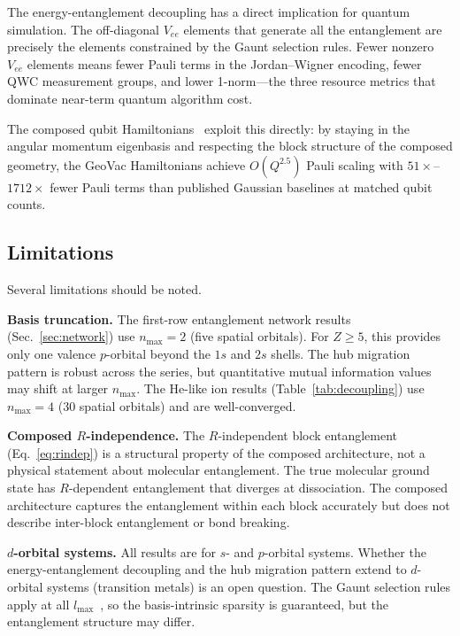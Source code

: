 \documentclass[twocolumn,pra,amsmath,amssymb,superscriptaddress]{revtex4-2}
\begin{document}
The energy-entanglement decoupling has a direct implication for
quantum simulation.  The off-diagonal $V_{ee}$ elements that
generate all the entanglement are precisely the elements constrained
by the Gaunt selection rules.  Fewer nonzero $V_{ee}$ elements
means fewer Pauli terms in the Jordan--Wigner encoding, fewer QWC
measurement groups, and lower 1-norm---the three resource metrics
that dominate near-term quantum algorithm cost.

The composed qubit Hamiltonians~\cite{GeoVac_Paper14} exploit this
directly: by staying in the angular momentum eigenbasis and
respecting the block structure of the composed geometry, the
GeoVac Hamiltonians achieve $O(Q^{2.5})$ Pauli scaling with
$51\times$--$1712\times$ fewer Pauli terms than published Gaussian
baselines at matched qubit counts.

\subsection{Limitations}

Several limitations should be noted.

\medskip\noindent\textbf{Basis truncation.}  The first-row
entanglement network results (Sec.~\ref{sec:network}) use
$n_{\max} = 2$ (five spatial orbitals).  For $Z \geq 5$, this
provides only one valence $p$-orbital beyond the $1s$ and $2s$
shells.  The hub migration pattern is robust across the series,
but quantitative mutual information values may shift at larger
$n_{\max}$.  The He-like ion results (Table~\ref{tab:decoupling})
use $n_{\max} = 4$ (30 spatial orbitals) and are well-converged.

\medskip\noindent\textbf{Composed $R$-independence.}  The
$R$-independent block entanglement (Eq.~\ref{eq:rindep}) is a
structural property of the composed architecture, not a physical
statement about molecular entanglement.  The true molecular
ground state has $R$-dependent entanglement that diverges at
dissociation.  The composed architecture captures the entanglement
within each block accurately but does not describe inter-block
entanglement or bond breaking.

\medskip\noindent\textbf{$d$-orbital systems.}  All results are
for $s$- and $p$-orbital systems.  Whether the energy-entanglement
decoupling and the hub migration pattern extend to $d$-orbital
systems (transition metals) is an open question.  The Gaunt
selection rules apply at all $l_{\max}$~\cite{GeoVac_Paper22},
so the basis-intrinsic sparsity is guaranteed, but the
entanglement structure may differ.
\end{document}

